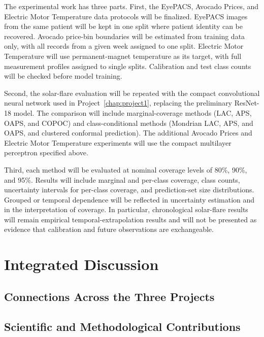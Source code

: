 \documentclass[12pt]{report}
\begin{document}
The experimental work has three parts. First, the EyePACS, Avocado Prices, and Electric Motor Temperature data protocols will be finalized. EyePACS images from the same patient will be kept in one split where patient identity can be recovered. Avocado price-bin boundaries will be estimated from training data only, with all records from a given week assigned to one split. Electric Motor Temperature will use permanent-magnet temperature as its target, with full measurement profiles assigned to single splits. Calibration and test class counts will be checked before model training.

Second, the solar-flare evaluation will be repeated with the compact convolutional neural network used in Project~\ref{chap:project1}, replacing the preliminary ResNet-18 model. The comparison will include marginal-coverage methods (LAC, APS, OAPS, and COPOC) and class-conditional methods (Mondrian LAC, APS, and OAPS, and clustered conformal prediction). The additional Avocado Prices and Electric Motor Temperature experiments will use the compact multilayer perceptron specified above.

Third, each method will be evaluated at nominal coverage levels of 80\%, 90\%, and 95\%. Results will include marginal and per-class coverage, class counts, uncertainty intervals for per-class coverage, and prediction-set size distributions. Grouped or temporal dependence will be reflected in uncertainty estimation and in the interpretation of coverage. In particular, chronological solar-flare results will remain empirical temporal-extrapolation results and will not be presented as evidence that calibration and future observations are exchangeable.

\chapter{Integrated Discussion}
\label{chap:discussion}

\section{Connections Across the Three Projects}


\section{Scientific and Methodological Contributions}
\end{document}
